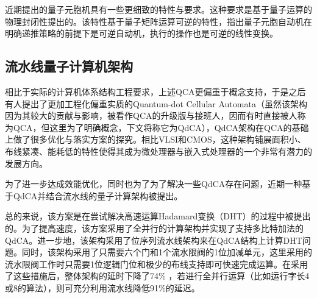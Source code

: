 \documentclass[UTF8, 11pt, a4paper]{ctexart}
\begin{document}
近期提出的量子元胞机具有一些更细致的特性与要求。这种要求是基于量子运算的物理封闭性提出的。该特性基于量子矩阵运算可逆的特性，指出量子元胞自动机在明确递推策略的前提下是可逆自动机，执行的操作也是可逆的线性变换。

\subsection{流水线量子计算机架构}

相比于实际的计算机体系结构工程要求，上述QCA更偏重于概念支持，于是之后有人提出了更加工程化偏重实质的Quantum-dot Cellular Automata（虽然该架构因为其较大的贡献与影响，被看作QCA的升级版与接班人，因而有时直接被人称为QCA，但这里为了明确概念，下文将称它为QdCA），QdCA架构在QCA的基础上做了很多优化与落实方案的探究。相比VLSI和CMOS，这种架构铺展面积小、布线紧凑、能耗低的特性使得其成为微处理器与嵌入式处理器的一个非常有潜力的发展方向。

为了进一步达成效能优化，同时也为了为了解决一些QdCA存在问题，近期一种基于QdCA并结合流水线的量子计算架构被提出\cite{pipeline}。

总的来说，该方案是在尝试解决高速运算Hadamard变换（DHT）的过程中被提出的。为了提高速度，该方案采用了全并行的计算架构并实现了支持多比特加法的QdCA。进一步地，该架构采用了位序列流水线架构来在QdCA结构上计算DHT问题。同时，该架构采用了只需要六个门和1个流水限阀的1位加减单元，这里采用的流水限阀工作时只需要1位逻辑门位和极少的布线支持即可快速完成运算。在采用了这些措施后，整体架构的延时下降了74\% ，若进行全并行运算（比如运行字长4或8的算法），则可充分利用流水线降低91\%的延迟。
\end{document}
